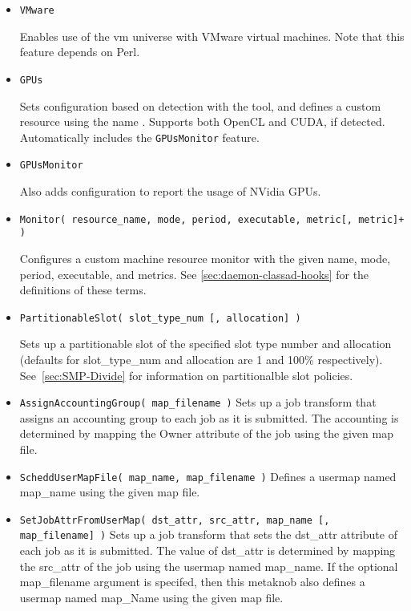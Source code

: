 \begin{description}
\begin{itemize}
    \item \texttt{VMware}

    Enables use of the vm universe with VMware virtual machines.
    Note that this feature depends on Perl. 

    \item \texttt{GPUs}

    Sets configuration based on detection with the 
    tool, and defines a custom resource using the name .
    Supports both OpenCL and CUDA, if detected.  Automatically includes
    the \texttt{GPUsMonitor} feature.

    \item \texttt{GPUsMonitor}

    Also adds configuration to report the usage of NVidia GPUs.

    \item \texttt{Monitor( resource\_name, mode, period, executable, metric[, metric]+ )}

    Configures a custom machine resource monitor with the given name, mode,
    period, executable, and metrics.  See \ref{sec:daemon-classad-hooks}
    for the definitions of these terms.

    \item \texttt{PartitionableSlot( slot\_type\_num [, allocation] )}

   	Sets up a partitionable slot of the specified slot type number
	and allocation (defaults for slot\_type\_num and allocation
	are 1 and 100\% respectively).
	See~\ref{sec:SMP-Divide} for information on partitionalble
	slot policies.

    \item \texttt{AssignAccountingGroup( map\_filename )}
	Sets up a  job transform that assigns an accounting group to
	each job as it is submitted. The accounting is determined by mapping the
	Owner attribute of the job using the given map file.

    \item \texttt{ScheddUserMapFile( map\_name, map\_filename )}
	Defines a  usermap named map\_name using the given map file.

    \item \texttt{SetJobAttrFromUserMap( dst\_attr, src\_attr, map\_name [, map\_filename] )}
	Sets up a  job transform that sets the dst\_attr attribute of each job
	as it is submitted. The value of dst\_attr is determined by mapping the src\_attr of the job
	using the usermap named map\_name.  If the optional map\_filename argument is specifed, then
	this metaknob also defines a  usermap named map\_Name using the given map file.


\end{itemize}
\end{description}

